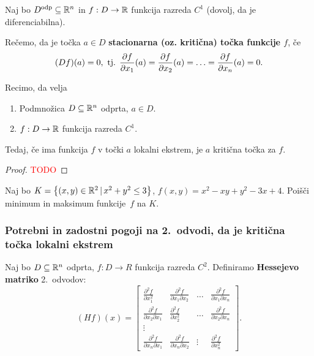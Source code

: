 \begin{definicija}
    Naj bo $D^\text{odp} \subseteq \mathbb{R}^n$ in $f: D \to \mathbb{R}$ funkcija razreda $C^1$ (dovolj, da je diferenciabilna). 
    
    Rečemo, da je točka $a \in D$ \textbf{stacionarna (oz. kritična) točka  funkcije $f$}, če $$(Df)(a) = 0, \text{ tj. } \frac{\partial f}{\partial x_1}(a) = \frac{\partial f}{\partial x_2}(a) = \ldots = \frac{\partial f}{\partial x_n}(a) = 0.$$
\end{definicija}

\begin{trditev}
    Recimo, da velja
    \begin{enumerate}
        \item Podmnožica $D \subseteq \mathbb{R}^n$ odprta, $a \in D$.
        \item $f: D \to \mathbb{R}$ funkcija razreda $C^1$.
    \end{enumerate}
    Tedaj, če ima funkcija $f$ v točki $a$ lokalni ekstrem, je $a$ kritična točka za $f$.
\end{trditev}

\begin{proof}
    \textcolor{red}{TODO}
\end{proof}

\begin{zgled}
    Naj bo $K = \left\{(x, y) \in \mathbb{R}^2 \,|\, x^2+y^2 \leq 3\right\}$, $f(x, y) = x^2 - xy + y^2 - 3x +4$. 
    Poišči minimum in maksimum funkcije~$f$ na $K$.
\end{zgled}

\subsubsection{Potrebni in zadostni pogoji na 2.\ odvodi, da je kritična točka lokalni ekstrem}
Naj bo $D \subseteq \mathbb{R}^n$ odprta, $f: D \to R$ funkcija razreda $C^2$. Definiramo \textbf{Hessejevo matriko} 2.\ odvodov:
$$(Hf) (x) = \begin{bmatrix}
    \frac{\partial^2 f}{\partial x_1^2} & \frac{\partial^2 f}{\partial x_1 \partial x_2} & \ldots & \frac{\partial^2 f}{\partial x_1 \partial x_n} \\
    \frac{\partial^2 f}{\partial x_2 \partial x_1} & \frac{\partial^2 f}{\partial x_2^2} & \ldots & \frac{\partial^2 f}{\partial x_2 \partial x_n} \\
    \vdots & & & \\
    \frac{\partial^2 f}{\partial x_n \partial x_1} & \frac{\partial^2 f}{\partial x_n \partial x_2} & \vdots & \frac{\partial^2 f}{\partial x_n^2}
\end{bmatrix}.$$

